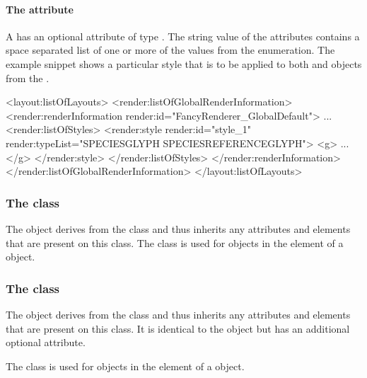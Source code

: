 \paragraph{The \fixttspace{} attribute}

A \Style has an optional attribute  of type
. The string value of the  attributes contains 
a space separated list of one or more of the values from the \StyleType enumeration.
 The example snippet shows a particular style that is to be applied to 
both  and  objects from 
the \LayoutPackage.

{\footnotesize
\begin{example}
<layout:listOfLayouts>
   <render:listOfGlobalRenderInformation>
      <render:renderInformation render:id="FancyRenderer_GlobalDefault">
             ...
        <render:listOfStyles>
             <render:style render:id="style_1" render:typeList="SPECIESGLYPH SPECIESREFERENCEGLYPH">
                <g> ... </g>
             </render:style> 
        </render:listOfStyles>
      </render:renderInformation>
   </render:listOfGlobalRenderInformation>
</layout:listOfLayouts>
\end{example}
}

\subsubsection{The  class}
\label{globalstyle-class}

The \GlobalStyle object derives from the \Style class and thus inherits
any attributes and elements that are present on this class. The \GlobalStyle 
class is used for objects in the \ListOfStyles element of a 
\GlobalRenderInformation object.



\subsubsection{The  class}
\label{localstyle-class}

The \LocalStyle object derives from the \Style class and thus inherits
any attributes and elements that are present on this class. It is identical to 
the \GlobalStyle object but has an additional optional  attribute.

The \LocalStyle class is used for objects in the \ListOfStyles element of a 
\LocalRenderInformation object.

